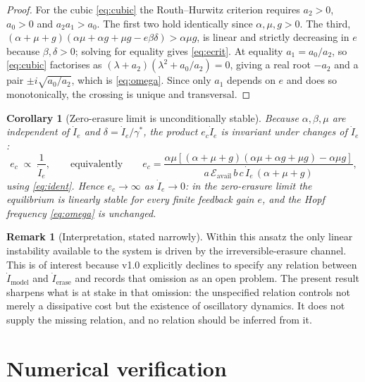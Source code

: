 \documentclass[11pt,a4paper]{article}
\newtheorem{corollary}[proposition]{Corollary}
\theoremstyle{definition}
\newtheorem{remark}[proposition]{Remark}
\begin{document}
\begin{proof}
For the cubic \eqref{eq:cubic} the Routh--Hurwitz criterion requires
$a_2>0$, $a_0>0$ and $a_2a_1>a_0$. The first two hold identically since
$\alpha,\mu,g>0$. The third,
$(\alpha+\mu+g)(\alpha\mu+\alpha g+\mu g-e\beta\delta)>\alpha\mu g$, is linear
and strictly decreasing in $e$ because $\beta,\delta>0$; solving for equality
gives \eqref{eq:ecrit}. At equality $a_1=a_0/a_2$, so \eqref{eq:cubic}
factorises as $(\lambda+a_2)(\lambda^{2}+a_0/a_2)=0$, giving a real root
$-a_2$ and a pair $\pm i\sqrt{a_0/a_2}$, which is \eqref{eq:omega}. Since only
$a_1$ depends on $e$ and does so monotonically, the crossing is unique and
transversal.
\end{proof}

\begin{corollary}[Zero-erasure limit is unconditionally stable]
\label{prop:scaling}
Because $\alpha,\beta,\mu$ are independent of $\dot I_e$ and
$\delta=\dot I_e/\gamma^{*}$, the product $e_c\dot I_e$ is invariant under
changes of $\dot I_e$:
\begin{equation}
e_c\;\propto\;\frac{1}{\dot I_e},
\qquad\text{equivalently}\qquad
e_c=\frac{\alpha\mu\left[(\alpha+\mu+g)(\alpha\mu+\alpha g+\mu g)-\alpha\mu g\right]}
{a\,\mathcal{E}_{\text{avail}}\,b\,c\,\dot I_e\,(\alpha+\mu+g)} ,
\end{equation}
using \eqref{eq:ident}. Hence $e_c\to\infty$ as $\dot I_e\to 0$: in the
zero-erasure limit the equilibrium is linearly stable for every finite
feedback gain $e$, and the Hopf frequency \eqref{eq:omega} is unchanged.
\end{corollary}

\begin{remark}[Interpretation, stated narrowly]
Within this ansatz the only linear instability available to the system is
driven by the irreversible-erasure channel. This is of interest because v1.0
explicitly declines to specify any relation between $\dot I_{\text{model}}$ and
$\dot I_{\text{erase}}$ and records that omission as an open problem. The
present result sharpens what is at stake in that omission: the unspecified
relation controls not merely a dissipative cost but the existence of
oscillatory dynamics. It does not supply the missing relation, and no relation
should be inferred from it.
\end{remark}

\section{Numerical verification}
\end{document}
